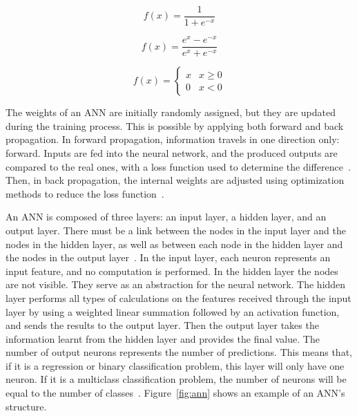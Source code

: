 
\begin{equation}\label{eq:1}
    f(x) = \frac{1}{1+e^{-x}}
\end{equation}

\begin{equation}\label{eq:2}
    f(x) = \frac{e^{x}-e^{-x}}{e^{x}+e^{-x}}
\end{equation}

\begin{equation} \label{eq:3}
    f(x) = \begin{cases}x & x \geq 0\\0 & x < 0\end{cases}
\end{equation}

The weights of an \gls{ANN} are initially randomly assigned, but they are updated during the training process. This is possible by applying both forward and back propagation. In forward propagation, information travels in one direction only: forward. Inputs are fed into the neural network, and the produced outputs are compared to the real ones, with a loss function used to determine the difference~\cite{Farizawani2020AApproaches}. Then, in back propagation, the internal weights are adjusted using optimization methods to reduce the loss function~\cite{Kim2021CBP:Method}. 

An \gls{ANN} is composed of three layers: an input layer, a hidden layer, and an output layer. There must be a link between the nodes in the input layer and the nodes in the hidden layer, as well as between each node in the hidden layer and the nodes in the output layer~\cite{Imran2019AClassification}. In the input layer, each neuron represents an input feature, and no computation is performed. In the hidden layer the nodes are not visible. They serve as an abstraction for the neural network. The hidden layer performs all types of calculations on the features received through the input layer by using a weighted linear summation followed by an activation function, and sends the results to the output layer. Then the output layer takes the information learnt from the hidden layer and provides the final value. The number of output neurons represents the number of predictions. This means that, if it is a regression or binary classification problem, this layer will only have one neuron. If it is a multiclass classification problem, the number of neurons will be equal to the number of classes~\cite{Alaloul2020DataNetworks}. Figure~\ref{fig:ann} shows an example of an \gls{ANN}'s structure.

